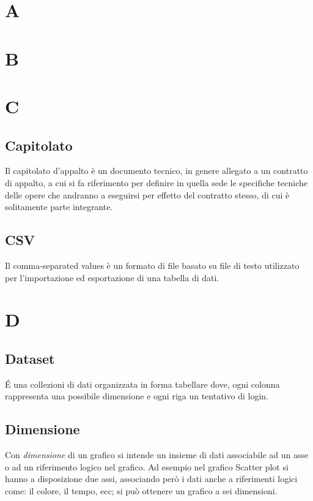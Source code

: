 \section{A}

\newpage
\section{B}

\newpage
\section{C}
\subsection{Capitolato}
Il capitolato d'appalto è un documento tecnico, in genere allegato a un contratto di appalto, a cui si fa riferimento per definire in quella sede le specifiche tecniche delle opere che andranno a eseguirsi per effetto del contratto stesso, di cui è solitamente parte integrante.

\subsection{CSV}
Il comma-separated values è un formato di file basato su file di testo utilizzato per l'importazione ed esportazione di una tabella di dati.

\newpage
\section{D}
\subsection{Dataset}
\'E una collezioni di dati organizzata in forma tabellare dove, ogni colonna rappresenta una possibile dimensione e ogni riga un tentativo di login.

\subsection{Dimensione}
Con \textit{dimensione} di un grafico si intende un insieme di dati associabile ad un asse o ad un riferimento logico nel grafico. Ad esempio nel grafico Scatter plot si hanno a disposizione due assi, associando però i dati anche a riferimenti logici come: il colore, il tempo, ecc; si può ottenere un grafico a sei dimensioni. 


